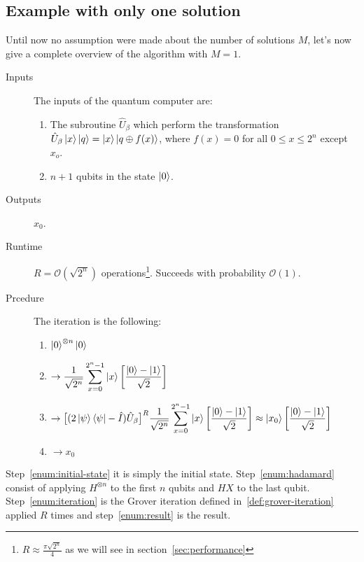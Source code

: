 \subsection{Example with only one solution}
Until now no assumption were made about the number of solutions $M$, let's now give a complete overview of the algorithm with $M=1$.
\begin{description}
   \item[Inputs] The inputs of the quantum computer are:
    \begin{enumerate}
  \item The subroutine $\hat{U}_\beta$ which perform the transformation $\hat{U}_\beta\ket{x}\ket{q} = \ket{x}\ket{q \oplus f(x)}$, where $f(x) = 0$ for all $0 \leq x \leq 2^n$ except $x_o$.
  \item $n+1$ qubits in the state $\ket{0}$.
\end{enumerate}
   \item[Outputs] $x_0$.
   \item[Runtime] $R = \mathcal{O}(\sqrt{2^n})$ operations\footnote{$R \approx \frac{\pi \sqrt{2^n}}{4}$ as we will see in section~\ref{sec:performance}}. Succeeds with probability $\mathcal{O}(1)$.
   \item[Prcedure] The iteration is the following:
   \begin{enumerate}
  \item $\ket{0}^{\otimes n} \ket{0}$ \label{enum:initial-state}
  \item $\begin{aligned} \rightarrow \frac{1}{\sqrt{2^n}} \sum_{x=0}^{2^n-1}\ket{x} \biggl[\frac{\ket{0}-\ket{1}}{\sqrt{2}}\biggr] \end{aligned}$ \label{enum:hadamard}
  \item $\begin{aligned} \rightarrow \bigl[(2 \ket{\psi}\bra{\psi} - \hat{I})\hat{U}_\beta\bigr]^R \frac{1}{\sqrt{2^n}} \sum_{x=0}^{2^n-1}\ket{x} \biggl[\frac{\ket{0}-\ket{1}}{\sqrt{2}}\biggr] \approx \ket{x_0} \biggl[\frac{\ket{0}-\ket{1}}{\sqrt{2}}\biggr] \end{aligned}$ \label{enum:iteration}
  \item $\rightarrow x_0$ \label{enum:result}
\end{enumerate}
\end{description}

Step~\ref{enum:initial-state} it is simply the initial state. Step~\ref{enum:hadamard} consist of applying $H^{\otimes n}$ to the first $n$ qubits and $H X$ to the last qubit. Step~\ref{enum:iteration} is the Grover iteration defined in~\ref{def:grover-iteration} applied $R$ times and step~\ref{enum:result} is the result.


